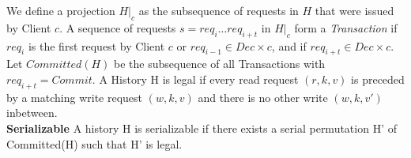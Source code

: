 We define a projection $H|_c$ as the subsequence of requests in $H$ that were issued by Client $c$. A sequence of requests $s = req_i \dots req_{i+t}$ in $H|_c$ form a \textit{Transaction} if $req_i$ is the first request by Client $c$ or $req_{i-1} \in Dec \times c$, and if $req_{i+t} \in Dec \times c$. Let $Committed(H)$ be the subsequence of all Transactions with $req_{i+t} = Commit$. A History H is legal if every read request $(r, k, v)$ is preceded by a matching write request $(w, k, v)$ and there is no other write $(w, k, v')$ inbetween.\\
\textbf{Serializable}  
A history H is serializable if there exists a serial permutation H' of Committed(H) such that H' is legal.
\fi
%
%
%
